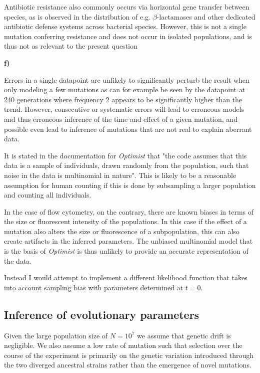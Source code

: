 \documentclass{article}
\begin{document}
Antibiotic resistance also commonly occurs via horizontal gene transfer between species, as is observed in the distribution of e.g. $\beta$-lactamases and other dedicated antibiotic defense systems across bacterial species. However, this is not a single mutation conferring resistance and does not occur in isolated populations, and is thus not as relevant to the present question

\textbf{f)}

Errors in a single datapoint are unlikely to significantly perturb the result when only modeling a few mutations as can for example be seen by the datapoint at 240 generations where frequency 2 appears to be significantly higher than the trend. However, consecutive or systematic errors will lead to erroneous models and thus erroneous inference of the time and effect of a given mutation, and possible even lead to inference of mutations that are not real to explain aberrant data.

It is stated in the documentation for \textit{Optimist} that "the code assumes that this data is a sample of individuals, drawn randomly from the population, such that noise in the data is multinomial in nature". This is likely to be a reasonable assumption for human counting if this is done by subsampling a larger population and counting all individuals. 

In the case of flow cytometry, on the contrary, there are known biases in terms of the size or fluorescent intensity of the populations. In this case if the effect of a mutation also alters the size or fluorescence of a subpopulation, this can also create artifacts in the inferred parameters. The unbiased multinomial model that is the basis of \textit{Optimist} is thus unlikely to provide an accurate representation of the data.

Instead I would attempt to implement a different likelihood function that takes into account sampling bias with parameters determined at $t=0$.

\subsection{Inference of evolutionary parameters}

Given the large population size of $N=10^7$ we assume that genetic drift is negligible. We also assume a low rate of mutation such that selection over the course of the experiment is primarily on the genetic variation introduced through the two diverged ancestral strains rather than the emergence of novel mutations.
\end{document}

